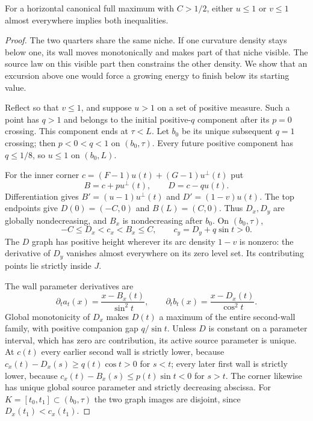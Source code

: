 \begin{lemma}
\label{lem:horizontal-transfer}
For a horizontal canonical full maximum with $C>1/2$, either
$u\le1$ or $v\le1$ almost everywhere implies both inequalities.
\end{lemma}
\begin{proof}
The two quarters share the same niche. If one curvature density stays
below one, its wall moves monotonically and makes part of that niche
visible. The source law on this visible part then constrains the other
density. We show that an excursion above one would force a growing
energy to finish below its starting value.

Reflect so that $v\le1$, and suppose $u>1$ on a set of positive
measure. Such a point has $q>1$ and belongs to the initial
positive-$q$ component after its $p=0$ crossing.
This component ends at $\tau<L$. Let $b_0$ be its unique
subsequent $q=1$ crossing; then $p<0<q<1$ on $(b_0,\tau)$.
Every future positive component has $q\le1/8$, so $u\le1$
on $(b_0,L)$.

For the inner corner $c=(F-1)u(t)+(G-1)u^\perp(t)$ put
\[
 B=c+p u^\perp(t),\qquad D=c-q u(t).
\]
Differentiation gives
$B'=(u-1)u^\perp(t)$ and $D'=(1-v)u(t)$.
The top endpoints give $D(0)=(-C,0)$ and $B(L)=(C,0)$.
Thus $D_x,D_y$ are globally nondecreasing, and $B_x$ is
nondecreasing after $b_0$. On $(b_0,\tau)$,
\begin{equation}\label{eq:horizontal-visible-window}
 -C\le D_x<c_x<B_x\le C,\qquad c_y=D_y+q\sin t>0.
\end{equation}
The $D$ graph has positive height wherever its arc density $1-v$
is nonzero: the derivative of $D_y$ vanishes almost everywhere
on its zero level set. Its contributing points lie strictly inside $J$.

The wall parameter derivatives are
\[
 \partial_t a_t(x)=\frac{x-B_x(t)}{\sin^2t},\qquad
 \partial_t b_t(x)=\frac{x-D_x(t)}{\cos^2t}.
\]
Global monotonicity of $D_x$ makes $D(t)$ a maximum of the
entire second-wall family, with positive companion gap $q/\sin t$.
Unless $D$ is constant on a parameter interval, which has zero
arc contribution, its active source parameter is unique.
At $c(t)$ every earlier second wall is strictly lower, because
$c_x(t)-D_x(s)\ge q(t)\cos t>0$ for $s<t$;
every later first wall is strictly lower, because
$c_x(t)-B_x(s)\le p(t)\sin t<0$ for $s>t$.
The corner likewise has unique global source parameter and
strictly decreasing abscissa.
For $K=[t_0,t_1]\subset(b_0,\tau)$ the two graph images are
disjoint, since $D_x(t_1)<c_x(t_1)$.


\end{proof}
